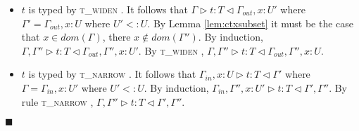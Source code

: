 \documentclass[preprint]{sigplanconf}
\newcommand{\lemref}[1]{Lemma \ref{#1}}
\newcommand{\tnarrow}{\textsc{t\_narrow} }
\newcommand{\twiden}{\textsc{t\_widen} }
\newcommand{\typerule}[4]{#1 \triangleright #2 : #3 \triangleleft #4}
\newcommand{\qed}{$\blacksquare$}
\newenvironment{proof}{\vspace{1ex}\noindent{\bf Proof}\hspace{0.5em}}
  {\hfill\qed\vspace{1ex}}
\begin{document}
\begin{proof}
\begin{itemize}
\item $t$ is typed by \twiden. It follows that $\typerule{\Gamma}{t}{T}{\Gamma_{out}, x : U'}$
where $\Gamma' = \Gamma_{out}, x : U$ where $U' <: U$. 
By \lemref{lem:ctxsubset} it must be the case that $x \in dom(\Gamma)$, there
$x \notin dom(\Gamma'')$.
By induction,
$\typerule{\Gamma, \Gamma''}{t}{T}{\Gamma_{out}, \Gamma'', x : U'}$.
By \twiden, 
$\typerule{\Gamma, \Gamma''}{t}{T}{\Gamma_{out}, \Gamma'', x : U}$.

\item $t$ is typed by \tnarrow. It follows that
$\typerule{\Gamma_{in}, x : U}{t}{T}{\Gamma'}$
where $\Gamma = \Gamma_{in}, x : U'$ where $U' <: U$.
By induction,
$\typerule{\Gamma_{in}, \Gamma'', x : U'}{t}{T}{\Gamma', \Gamma''}$.
By rule \tnarrow,
$\typerule{\Gamma, \Gamma''}{t}{T}{\Gamma', \Gamma''}$.
\end{itemize}
\end{proof}

\end{document}
